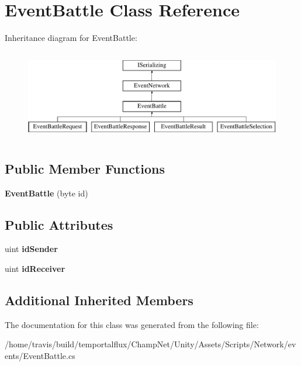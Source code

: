 \hypertarget{class_event_battle}{\section{Event\-Battle Class Reference}
\label{class_event_battle}
}
Inheritance diagram for Event\-Battle\-:\begin{figure}[H]
\begin{center}
\leavevmode
\includegraphics[height=4.000000cm]{class_event_battle}
\end{center}
\end{figure}
\subsection*{Public Member Functions}
\begin{DoxyCompactItemize}
\item 
\hypertarget{class_event_battle_a2e50e3860526edbba767018e38419e6f}{{\bfseries Event\-Battle} (byte id)}\label{class_event_battle_a2e50e3860526edbba767018e38419e6f}

\end{DoxyCompactItemize}
\subsection*{Public Attributes}
\begin{DoxyCompactItemize}
\item 
\hypertarget{class_event_battle_a0e83fdfd6da5aeb1c5f452f2ab499f78}{uint {\bfseries id\-Sender}}\label{class_event_battle_a0e83fdfd6da5aeb1c5f452f2ab499f78}

\item 
\hypertarget{class_event_battle_a9c9705b0dc0d1789a0eaabacfdc1cc61}{uint {\bfseries id\-Receiver}}\label{class_event_battle_a9c9705b0dc0d1789a0eaabacfdc1cc61}

\end{DoxyCompactItemize}
\subsection*{Additional Inherited Members}


The documentation for this class was generated from the following file\-:\begin{DoxyCompactItemize}
\item 
/home/travis/build/temportalflux/\-Champ\-Net/\-Unity/\-Assets/\-Scripts/\-Network/events/Event\-Battle.\-cs\end{DoxyCompactItemize}
